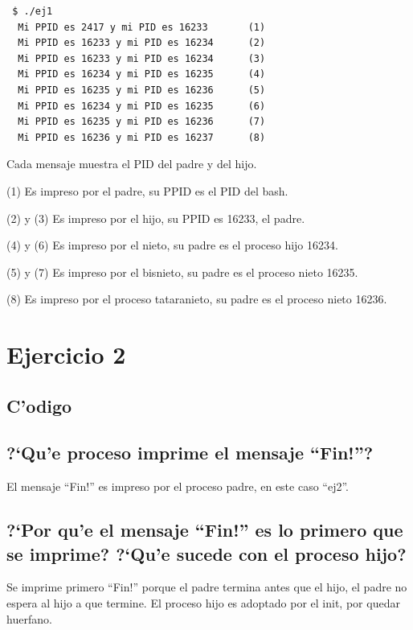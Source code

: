 \documentclass[a4paper,8pt]{article}
\newcommand{\?}{?`}
\begin{document}
\begin{lstlisting}
 $ ./ej1
  Mi PPID es 2417 y mi PID es 16233       (1)
  Mi PPID es 16233 y mi PID es 16234      (2)
  Mi PPID es 16233 y mi PID es 16234      (3)
  Mi PPID es 16234 y mi PID es 16235      (4)
  Mi PPID es 16235 y mi PID es 16236      (5)
  Mi PPID es 16234 y mi PID es 16235      (6)
  Mi PPID es 16235 y mi PID es 16236      (7)
  Mi PPID es 16236 y mi PID es 16237      (8)
\end{lstlisting}

Cada mensaje muestra el PID del padre y del hijo.

\begin{description}
 \item (1) Es impreso por el padre, su PPID es el PID del bash.
 \item (2) y (3) Es impreso por el hijo, su PPID es 16233, el padre.
 \item (4) y (6) Es impreso por el nieto, su padre es el proceso hijo 16234.
 \item (5) y (7) Es impreso por el bisnieto, su padre es el proceso nieto 16235.
 \item (8) Es impreso por el proceso tataranieto, su padre es el proceso nieto 16236.
\end{description}

\section{Ejercicio 2}
\subsection{C'odigo}

\subsection[Punto A]{\?Qu'e proceso imprime el mensaje ``Fin!''?}
El mensaje ``Fin!'' es impreso por el proceso padre, en este caso ``ej2''.

\subsection[Punto B]{\?Por qu'e el mensaje ``Fin!'' es lo primero que se imprime? \?Qu'e sucede con el proceso hijo?}
Se imprime primero ``Fin!'' porque el padre termina antes que el hijo, el padre no espera al hijo a que termine. El proceso hijo es adoptado por el init, por quedar huerfano.
\end{document}
